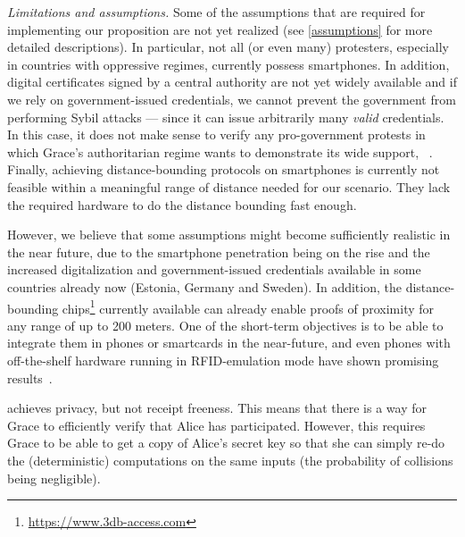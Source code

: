 \emph{Limitations and assumptions.} Some of the assumptions that are required 
for implementing our proposition are not yet realized (see \cref{assumptions} 
for more detailed descriptions). In particular, not all (or even many) 
protesters, especially in countries with oppressive regimes, currently possess 
smartphones.
In addition, digital certificates signed by a central authority are not yet widely available and if we rely on government-issued credentials, we cannot prevent the government from performing Sybil attacks --- since it can issue arbitrarily many \emph{valid} credentials. 
In this case, it does not make sense to verify any pro-government protests in 
which Grace's authoritarian regime wants to demonstrate its wide support, 
\eg~\cite{AlJazeeraOnVenezuela2017,VenezuelanStateWorkersCalledToParticipate}.
Finally, achieving distance-bounding protocols on smartphones is currently not 
feasible within a meaningful range of distance needed for our scenario.
They lack the required hardware to do the distance bounding fast enough.

However, we believe that some assumptions might become sufficiently realistic in 
the near future, due to the smartphone penetration being on the rise and the 
increased digitalization and government-issued credentials available in some 
countries already now (\eg Estonia, Germany and Sweden).
In addition, the distance-bounding 
chips\footnote{\url{https://www.3db-access.com}} currently available can already 
enable proofs of proximity for any range of up to 200 meters.
One of the short-term objectives is to be able to integrate them in phones or smartcards in the near-future, and even phones with off-the-shelf hardware running in RFID-emulation mode have shown promising results~\cite{DBonSmartphones}.

\PRIVO achieves privacy, but not receipt freeness.
This means that there is a way for Grace to efficiently verify that Alice has 
participated.
However, this requires Grace to be able to get a copy of Alice's secret key so that she can simply re-do the (deterministic) computations on the same inputs (the probability of collisions being negligible).

